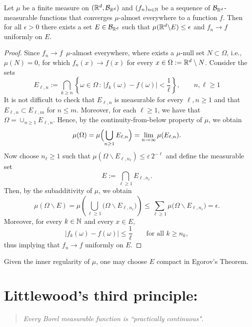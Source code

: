 \begin{theorem}
	Let $\mu$ be a finite measure on $(\mathbb R^d,\mathcal B_{\mathbb R^d})$ and $(f_n)_{n\in\mathbb N}$ be a sequence of $\mathcal B_{\mathbb R^d}$-measurable functions that converges $\mu$-almost everywhere to a function $f$. 
	Then for all $\epsilon > 0$ there exists a set $E\in \mathcal B_{\mathbb R^d}$ such that
	$\mu(\mathbb R^d\backslash E) \le\epsilon$ and $f_n \to f$ uniformly on $E$.
\end{theorem}
\begin{proof}
	Since $f_n\to f$\, $\mu$-almost everywhere, where exists a $\mu$-null set $N\subset\Omega$, i.e., $\mu(N)=0$, for which $f_n(x)\to f(x)$ for every $x\in \Omega:=\mathbb R^d\setminus N$. Consider the sets
	\[
		E_{\ell,n} := \bigcap_{k\ge n} \left\{ \omega\in \Omega\,:\, |f_k(\omega)-f(\omega)| < \frac{1}{\ell}\right\},\qquad n,\ell\ge 1
	\]
	It is not difficult to check that $E_{\ell,n}$ is measurable for every $\ell,n\ge 1$ and that $E_{\ell,n}\subset E_{\ell,m}$ for $n\le m$. Moreover, for each $\ell\ge 1$, we have that $\Omega = \cup_{n\ge 1} E_{\ell,n}$. Hence, by the continuity-from-below property of $\mu$, we obtain
	\[
		\mu(\Omega) = \mu\Bigl(\bigcup_{n\ge 1} E_{\ell,n}\Bigr) = \lim_{n\to\infty} \mu(E_{\ell,n}).
	\]
	Now choose $n_\ell\ge 1$ such that $\mu(\Omega\backslash E_{\ell,n_\ell}) \le \varepsilon\,2^{-\ell}$ and define the measurable set
	\[
		E := \bigcap_{\ell\ge 1} E_{\ell,n_\ell}.
	\]
	Then, by the subadditivity of $\mu$, we obtain
	\[
		\mu(\Omega\backslash E) = \mu\left(\bigcup_{\ell\ge 1}\bigl(\Omega\backslash E_{\ell,n_\ell}\bigr)\right) \le \sum_{\ell\ge 1} \mu\bigl(\Omega\backslash E_{\ell,n_\ell}\bigr) = \epsilon.
	\]
	Moreover, for every $k \in \mathbb N$ and every $x \in E$,
	\[
		|f_k(\omega) - f(\omega)| \leq \frac{1}{\ell}\qquad\text{for all $k\ge n_k$},
	\]
	thus implying that $f_n \to f$ uniformly on $E$.
\end{proof}

\begin{remark}
	Given the inner regularity of $\mu$, one may choose $E$ compact in Egorov's Theorem. 
\end{remark}

\section{Littlewood's third principle:} 
\begin{quotation}
	\emph{Every Borel measurable function is ``practically continuous"}.	
\end{quotation}

